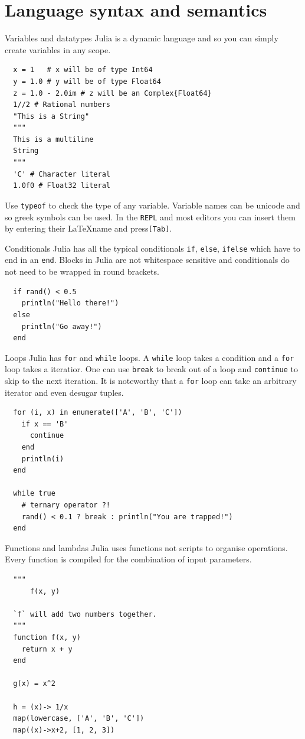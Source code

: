 \documentclass{beamer}
\begin{document}
\section{Language syntax and semantics}
\begin{frame}[fragile]{Variables and datatypes}
  Julia is a dynamic language and so you can simply create variables in any scope.
  \begin{lstlisting}
  x = 1   # x will be of type Int64
  y = 1.0 # y will be of type Float64
  z = 1.0 - 2.0im # z will be an Complex{Float64}
  1//2 # Rational numbers
  "This is a String"
  """
  This is a multiline
  String
  """
  'C' # Character literal
  1.0f0 # Float32 literal
  \end{lstlisting}
  Use \verb|typeof| to check the type of any variable. Variable names can be unicode and so greek symbols can be used.
  In the \verb|REPL| and most editors you can insert them by entering their \LaTeX name and press\verb|[Tab]|.
\end{frame}
\begin{frame}[fragile]{Conditionals}
  Julia has all the typical conditionals \verb|if|, \verb|else|, \verb|ifelse| which have to end in an \verb|end|.
  Blocks in Julia are not whitespace sensitive and conditionals do not need to be wrapped in round brackets.

  \begin{lstlisting}
  if rand() < 0.5
    println("Hello there!")
  else
    println("Go away!")
  end
  \end{lstlisting}

\end{frame}
\begin{frame}[fragile]{Loops}
  Julia has \verb|for| and \verb|while| loops. A \verb|while| loop takes a condition and a \verb|for| loop takes a iteratior.
  One can use \verb|break| to break out of a loop and \verb|continue| to skip to the next iteration. It is noteworthy that a \verb|for| loop can take an arbitrary iterator and even desugar tuples.
  \begin{lstlisting}
  for (i, x) in enumerate(['A', 'B', 'C'])
    if x == 'B'
      continue
    end
    println(i)
  end

  while true
    # ternary operator ?!
    rand() < 0.1 ? break : println("You are trapped!")
  end
  \end{lstlisting}
\end{frame}
\begin{frame}[fragile]{Functions and lambdas}
  Julia uses functions not scripts to organise operations. Every function is compiled for the combination of input parameters.
  \begin{lstlisting}
  """
      f(x, y)

  `f` will add two numbers together.
  """
  function f(x, y)
    return x + y
  end

  g(x) = x^2

  h = (x)-> 1/x
  map(lowercase, ['A', 'B', 'C'])
  map((x)->x+2, [1, 2, 3])
  \end{lstlisting}
\end{frame}
\end{document}
